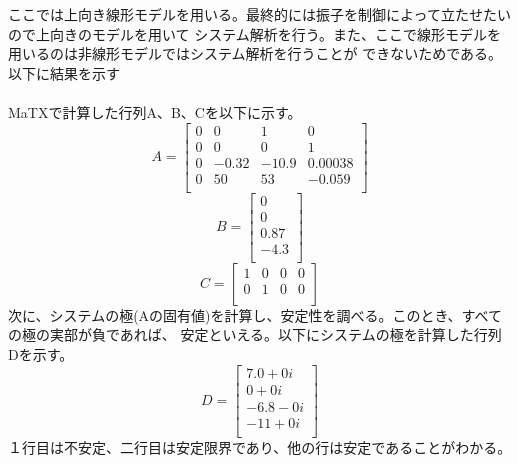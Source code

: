 \documentclass{jarticle}
\begin{document}
\begin{enumerate}
\begin{enumerate}
\begin{enumerate}
					ここでは上向き線形モデルを用いる。最終的には振子を制御によって立たせたいので上向きのモデルを用いて
					システム解析を行う。また、ここで線形モデルを用いるのは非線形モデルではシステム解析を行うことが
					できないためである。以下に結果を示す\\
					\\
					MaTXで計算した行列A、B、Cを以下に示す。\\
					\begin{equation}
						A=\left[
						\begin{array}{cccc}
							0 & 0 & 1 & 0 \\
							0 & 0 & 0 & 1 \\
							0 & -0.32 & -10.9 & 0.00038 \\
							0 & 50 & 53 & -0.059 \\
						\end{array}
						\right]
					\end{equation}
					\begin{equation}
						B=\left[
						\begin{array}{c}
							0 \\
							0 \\
							0.87 \\
							-4.3 \\
						\end{array}
						\right]
					\end{equation}
					\begin{equation}
						C=\left[
						\begin{array}{cccc}
							1 & 0 & 0 & 0 \\
							0 & 1 & 0 & 0 \\
						\end{array}
						\right]
					\end{equation}
					次に、システムの極(Aの固有値)を計算し、安定性を調べる。このとき、すべての極の実部が負であれば、
					安定といえる。以下にシステムの極を計算した行列Dを示す。
					\begin{equation}
						D=\left[
						\begin{array}{c}
							7.0+0i\\
							0+0i \\
							-6.8-0i \\
							-11+0i\\
						\end{array}
						\right]
					\end{equation}
					１行目は不安定、二行目は安定限界であり、他の行は安定であることがわかる。\\	
				

\end{enumerate}
\end{enumerate}
\end{enumerate}
\end{document}
